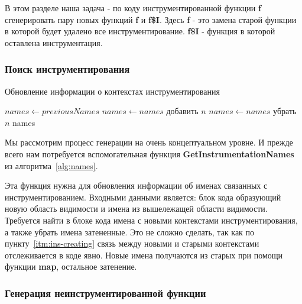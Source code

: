 В этом разделе наша задача - по коду инструментированной функции \textbf{f}
сгенерировать пару новых функций \textbf{f} и \textbf{f\$I}.
Здесь \textbf{f} - это замена старой функции в которой будет удалено
все инструментирование.
\textbf{f\$I} - функция в которой оставлена инструментация.

\subsubsection{Поиск инструментирования}

\begin{algorithm}
  \caption{Обновление информации о контекстах инструментирования}\label{alg:names}
  \begin{algorithmic}[1]
    \State $names \gets previousNames$
    \State $names \gets names$ добавить $n$
    \State $names \gets names$ убрать $n$
    \EndIf
    \EndFor
    \State \Return names
    \EndFunction
  \end{algorithmic}
\end{algorithm}

Мы рассмотрим процесс генерации на очень концептуальном уровне.
И прежде всего нам потребуется вспомогательная функция
\textbf{GetInstrumentationNames} из алгоритма~\ref{alg:names}.

Эта функция нужна для обновления информации об именах связанных с
инструментированием.
Входными данными является: блок кода образующий новую область видимости и
имена из вышележащей области видимости.
Требуется найти в блоке кода имена с новыми контекстами инструментирования,
а также убрать имена затененные.
Это не сложно сделать, так как по пункту~\ref{itm:ins-creating} связь между
новыми и старыми контекстами отслеживается в коде явно.
Новые имена получаются из старых при помощи функции \textbf{map},
остальное затенение.

\subsubsection{Генерация неинструментированной функции}

